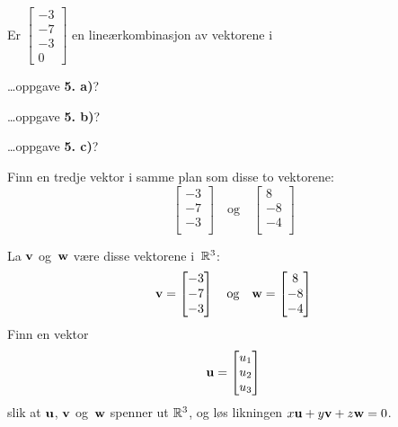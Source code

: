 \begin{oppgave}
	Er 
	$
	\begin{bmatrix}
	-3  \\
	-7 \\
	-3 \\
	0
	\end{bmatrix}
	$
	en lineærkombinasjon av vektorene i 
	
\begin{punkt}
\ldots oppgave \textbf{5. a)}?
\end{punkt} 
\begin{punkt}
	\ldots oppgave \textbf{5. b)}?
\end{punkt} 
\begin{punkt}
	\ldots oppgave \textbf{5. c)}?
\end{punkt} 
\end{oppgave}



\begin{oppgave}
	Finn en tredje vektor i samme plan som disse to vektorene:
\[
	\begin{bmatrix}
	-3  \\
	-7 \\
	-3 \\
	\end{bmatrix}
	\quad\text{og}\quad
	\begin{bmatrix}
	8  \\
	-8 \\
	-4 \\
	\end{bmatrix}
\]
\end{oppgave}




\begin{oppgave}
La $\mathbf{v}$ og~$\mathbf{w}$ være disse vektorene i~$\mathbb{R}^3$:
\[
	\mathbf{v}=
	\begin{bmatrix}
	-3  \\
	-7 \\
	-3 \\
	\end{bmatrix}
	\quad\text{og}\quad
	\mathbf{w}=
	\begin{bmatrix}
	8  \\
	-8 \\
	-4 \\
	\end{bmatrix}
\]
	Finn en vektor 
\[
	\mathbf{u}=\begin{bmatrix}
	u_1    \\
	u_2 \\
	u_3  
	\end{bmatrix}
\]
slik at $\mathbf{u}$, $\mathbf{v}$ og~$\mathbf{w}$
	spenner ut $\mathbb{R}^3$, og løs likningen $x\mathbf{u}+y\mathbf{v}+z\mathbf{w}=0$.
\end{oppgave}





